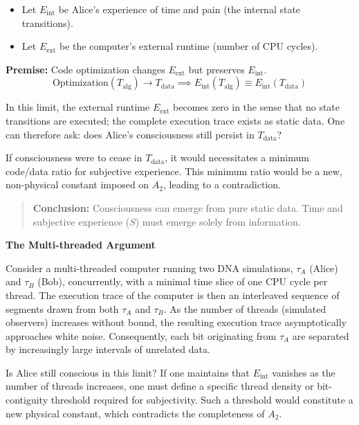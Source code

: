 \begin{itemize}
    \item Let $E_{\text{int}}$ be Alice's experience of time and pain (the internal state transitions).
    \item Let $E_{\text{ext}}$ be the computer's external runtime (number of CPU cycles).
\end{itemize}

\textbf{Premise:} Code optimization changes $E_{\text{ext}}$ but preserves $E_{\text{int}}$.
\[
\text{Optimization}(T_{\text{alg}}) \rightarrow T_{\text{data}} \implies E_{\text{int}}(T_{\text{alg}}) \equiv E_{\text{int}}(T_{\text{data}})
\]

In this limit, the external runtime \(E_{\text{ext}}\) becomes zero in the sense that no state transitions are executed; the complete execution trace exists as static data.
One can therefore ask: does Alice's consciousness still persist in $T_{\text{data}}$?

If consciousness were to cease in $T_{\text{data}}$, it would necessitates a minimum code/data ratio for subjective experience.
This minimum ratio would be a new, non-physical constant imposed on $A_2$, leading to a contradiction.

\begin{quote}
  \textbf{Conclusion:} Consciousness can emerge from pure static data.
  Time and subjective experience ($S$) must emerge solely from information.
\end{quote}

\textbf{The Multi-threaded Argument}

Consider a multi-threaded computer running two DNA simulations, $\tau_A$ (Alice) and $\tau_B$ (Bob), concurrently, with a minimal time slice of one CPU cycle per thread.
The execution trace of the computer is then an interleaved sequence of segments drawn from both $\tau_A$ and $\tau_B$.
As the number of threads (simulated observers) increases without bound, the resulting execution trace asymptotically approaches white noise.
Consequently, each bit originating from $\tau_A$ are separated by increasingly large intervals of unrelated data.

Is Alice still conscious in this limit? If one maintains that $E_{\text{int}}$ vanishes as the number of threads increases, one must define a
specific thread density or bit-contiguity threshold required for subjectivity. Such a threshold would constitute a new physical constant,
which contradicts the completeness of $A_2$.

